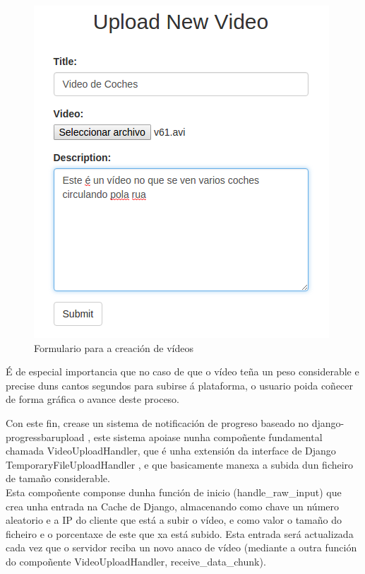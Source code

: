     \begin{figure}[htp]
    \begin{center}
        \includegraphics[scale=0.6]{figures/SubidaVideoForm.png}
        \caption{Formulario para a creación de vídeos}
    \label{fig:SubidaVideoForm}
    \end{center}
    \end{figure}	
	
	É de especial importancia que no caso de que o vídeo teña un peso considerable e precise 
	duns cantos segundos para subirse á plataforma, o usuario poida coñecer de forma gráfica
	o avance deste proceso.
	
	Con este fin, crease un sistema de notificación de progreso baseado no 
	django-progressbarupload \cite{django-progressbarupload}, este sistema apoiase nunha compoñente
	fundamental chamada VideoUploadHandler, que é unha extensión da interface de Django 
	TemporaryFileUploadHandler \cite{TemporaryFileUploadHandler}, e que basicamente manexa a subida
	dun ficheiro de tamaño considerable.\\
	
	Esta compoñente componse dunha función de inicio (handle\_raw\_input) que crea unha entrada 
	na Cache de Django, almacenando como chave un número aleatorio e a IP do cliente que está a
	subir o vídeo, e como valor o tamaño do ficheiro e o porcentaxe de este que xa está subido.
	Esta entrada será actualizada cada vez que o servidor reciba un novo anaco de vídeo (mediante
	a outra función do compoñente VideoUploadHandler, receive\_data\_chunk). 
	
